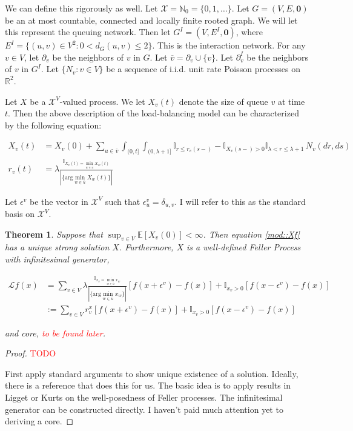 \documentclass[12pt]{article}
\newcommand{\mb}{\mathbb}
\newcommand{\mc}{\mathcal}
\newcommand{\ov}{\overline}
\newcommand{\te}{\text}
\newcommand{\ep}{\epsilon}
\newcommand{\tr}{\textcolor{red}}
\newcommand{\ind}{\hspace{24pt}}
\newcommand{\ex}[1]{\mb{E}\left[#1\right]}			%
\newcommand{\argmin}{\te{arg}\min}
\newcommand{\sta}{\mc{X}}							%
\newcommand{\neigh}[1]{\partial_{#1}}				%
\newcommand{\cl}[1]{\ov{#1}}						%
\renewcommand{\root}{\mathbf{0}}
\newcommand{\Xf}{X}									%
\newcommand{\poiss}{N}								%
\newcommand{\poissv}[1]{_{#1}}						%
\newcommand{\vind}[1]{_{#1}}						%
\newcommand{\tme}[1]{(#1)}							%
\newcommand{\arr}{\lambda}							%
\newcommand{\neighI}[1]{\partial^I_{#1}}			%
\newcommand{\IG}{\mc{L}}							%
\newcommand{\ev}[1]{\ep^{#1}}						%
\newcommand{\para}[1]{^{#1}}
\newcommand{\inter}[1]{#1^I}
\newtheorem{thms}{Theorem}[section]
\begin{document}
\ind We can define this rigorously as well. Let \(\sta = \mb{N}_0 = \{0,1,\dots\}\). Let \(G = (V,E,\root)\) be an at most countable, connected and locally finite rooted graph. We will let this represent the queuing network. Then let \(\inter{G} = (V,\inter{E},\root)\), where \(\inter{E} = \{(u,v) \in V^2: 0 < d_G(u,v)\leq 2\}\). This is the interaction network. For any \(v \in V\), let \(\neigh{v}\) be the neighbors of \(v\) in \(G\). Let \(\cl{v} = \neigh{v}\cup \{v\}\). Let \(\neighI{v}\) be the neighbors of \(v\) in \(\inter{G}\). Let \(\{\poiss\poissv{v}:v \in V\}\) be a sequence of i.i.d. unit rate Poisson processes on \(\mb{R}^2\).

\ind Let \(\Xf\) be a \(\sta^V\)-valued process. We let \(\Xf\vind{v}\tme{t}\) denote the size of queue \(v\) at time \(t\). Then the above description of the load-balancing model can be characterized by the following equation:

\begin{align}
\Xf\vind{v}\tme{t} &= \Xf\vind{v}\tme{0} + \sum_{u \in \cl{v}} \int_{(0,t]}\int_{(0,\arr + 1]} \mb{I}_{r \leq r\vind{v}\tme{s-}} - \mb{I}_{\Xf\vind{v}\tme{s-} > 0}\mb{I}_{\arr < r \leq \arr+1}\,\poiss\poissv{v}(dr,ds)\label{mod::Xf}\\
r\vind{v}\tme{t} &= \arr\frac{\mb{I}_{\Xf\vind{v}\tme{t} = \min_{w \in \cl{u}} \Xf\vind{w}\tme{t}}}{|\{\argmin_{w \in \cl{u}} \Xf\vind{w}\tme{t}\}|}\nonumber
\end{align}

Let \(\ev{v}\) be the vector in \(\sta^V\) such that \(\ev{v}\vind{u} = \delta_{u,v}\). I will refer to this as the standard basis on \(\sta^V\).

\begin{thms}
Suppose that \(\sup_{v \in V} \ex{\Xf\vind{v}\tme{0}} < \infty\). Then equation \eqref{mod::Xf} has a unique strong solution \(\Xf\). Furthermore, \(\Xf\) is a well-defined Feller Process with infinitesimal generator,

\begin{align}
\IG f(x) &= \sum_{v \in V}\arr\frac{\mb{I}_{x\vind{v} = \min_{w \in \cl{u}} x\vind{w}}}{|\{\argmin_{w \in \cl{u}} x\vind{w}\}|}[f(x + \ev{v}) - f(x)] + \mb{I}_{x\vind{v} > 0}[f(x-\ev{v}) - f(x)]\nonumber\\
&:= \sum_{v \in V}r\vind{v}\para{x}[f(x + \ev{v}) - f(x)] + \mb{I}_{x\vind{v} > 0}[f(x-\ev{v}) - f(x)]\label{mod::IG}
\end{align}

and core, \tr{to be found later}.
\label{mod::Feller}
\end{thms}
\begin{proof}
\tr{TODO}

First apply standard arguments to show unique existence of a solution. Ideally, there is a reference that does this for us. The basic idea is to apply results in Ligget or Kurts on the well-posedness of Feller processes. The infinitesimal generator can be constructed directly. I haven't paid much attention yet to deriving a core.
\end{proof}
\end{document}
